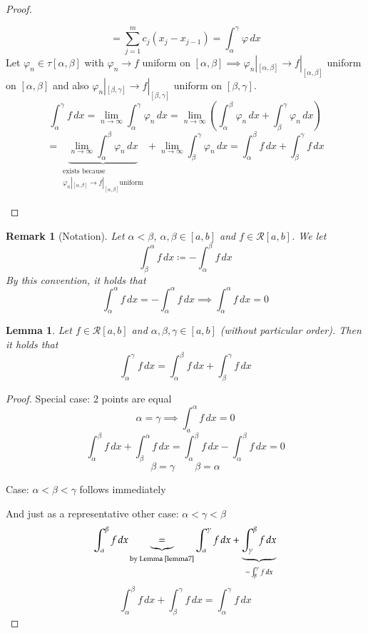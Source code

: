 \documentclass{article}
\newtheorem{lemma}{Lemma}  \numberwithin{lemma}{section}
\newtheorem{remark}{Remark}  \numberwithin{remark}{section}
\begin{document}
\begin{proof}
\begin{description}
\[      \]
      \[ = \sum_{j=1}^m c_j(x_j - x_{j-1}) = \int_{\alpha}^\gamma \varphi \, dx \]
      Let $\varphi_n \in \tau[\alpha,\beta]$ with $\varphi_n \to f$ uniform on $[\alpha, \beta] \implies \varphi_n|_{[\alpha,\beta]} \to f|_{[\alpha,\beta]}$ uniform on $[\alpha,\beta]$ and also $\varphi_n|_{[\beta,\gamma]} \to f|_{[\beta,\gamma]}$ uniform on $[\beta,\gamma]$.
      \[ \int_{\alpha}^\gamma f \, dx = \lim_{n\to\infty} \int_{\alpha}^\gamma \varphi_n \, dx = \lim_{n\to\infty} \left(\int_{\alpha}^\beta \varphi_n \, dx + \int_{\beta}^\gamma \varphi_n \, dx\right) \]
      \[
        = \underbrace{\lim_{n\to\infty} \int_{\alpha}^\beta \varphi_n \, dx}_{\substack{\text{exists because } \\ \varphi_n|_{[\alpha,\beta]} \to f|_{[\alpha,\beta]} \text{uniform}}} + \lim_{n\to\infty} \int_{\beta}^\gamma \varphi_n \, dx
        = \int_{\alpha}^\beta f \, dx + \int_{\beta}^\gamma f \, dx
      \]
  \end{description}
\end{proof}

\begin{remark}[Notation]
  Let $\alpha < \beta$, $\alpha, \beta \in [a,b]$ and $f \in \mathcal R[a,b]$. We let
  \[ \int_{\beta}^\alpha f \, dx \coloneqq -\int_{\alpha}^\beta f \, dx \]
  By this convention, it holds that
  \[ \int_{\alpha}^\alpha f \, dx = -\int_{\alpha}^\alpha f \, dx \implies \int_{\alpha}^\alpha f \, dx = 0 \]
\end{remark}

\begin{lemma} %
  \label{lemma8}
  Let $f \in \mathcal R[a,b]$ and $\alpha,\beta,\gamma \in [a,b]$ (without particular order).
  Then it holds that
  \[ \int_{\alpha}^\gamma f \, dx = \int_{\alpha}^\beta f \, dx + \int_{\beta}^\gamma f \, dx \]
\end{lemma}

\begin{proof}
  Special case: 2 points are equal
  \[ \alpha = \gamma \implies \int_a^\alpha f \, dx = 0 \]
  \[ \int_\alpha^\beta f \, dx + \int_\beta^\alpha f \, dx = \int_{\alpha}^\beta f \, dx - \int_\alpha^\beta f \, dx = 0 \]
  \[ \beta = \gamma \qquad \beta = \alpha \]

  Case: $\alpha < \beta < \gamma$ follows immediately

  And just as a representative other case: $\alpha < \gamma < \beta$
  \[ \int_{\alpha}^\beta f \, dx \underbrace{=}_{\text{by Lemma~\ref{lemma7}}} \int_{\alpha}^\gamma f \, dx + \underbrace{\int_{\gamma}^\beta f \, dx}_{- \int_{\beta}^\gamma f \, dx} \]
  \[ \int_\alpha^\beta f \, dx + \int_\beta^\gamma f \, dx = \int_\alpha^\gamma f \, dx \]
\end{proof}
\end{document}

